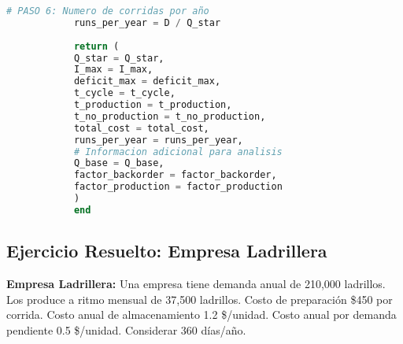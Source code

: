 \documentclass[12pt,a4paper]{book}
\begin{document}
\begin{tcolorbox}[enhanced,colback=violetaclaro,colframe=moradoacento,boxrule=3pt,arc=12pt,
		drop shadow,title={\Large\bfseries\color{white} \faIndustry\ PRODUCCI\'ON CON BACKORDERS},breakable]
\begin{lstlisting}[language=Julia,basicstyle=\footnotesize\ttfamily]
			# PASO 6: Numero de corridas por año
			runs_per_year = D / Q_star
			
			return (
			Q_star = Q_star,
			I_max = I_max,
			deficit_max = deficit_max,
			t_cycle = t_cycle,
			t_production = t_production,
			t_no_production = t_no_production,
			total_cost = total_cost,
			runs_per_year = runs_per_year,
			# Informacion adicional para analisis
			Q_base = Q_base,
			factor_backorder = factor_backorder,
			factor_production = factor_production
			)
			end
		\end{lstlisting}
		
	\end{tcolorbox}
	
	\subsection{Ejercicio Resuelto: Empresa Ladrillera}
	
	\begin{tcolorbox}[enhanced,colback=naranjaclaro,colframe=naranjaacento,boxrule=2pt,arc=8pt,
		drop shadow,title={\bfseries\color{white} \faPuzzlePiece\ PROBLEMA EMPRESA LADRILLERA}]
		
		\textbf{Empresa Ladrillera:} Una empresa tiene demanda anual de 210,000 ladrillos. Los produce a ritmo mensual de 37,500 ladrillos. Costo de preparaci\'on \$450 por corrida. Costo anual de almacenamiento 1.2 \$/unidad. Costo anual por demanda pendiente 0.5 \$/unidad. Considerar 360 d\'ias/a\~no.
		
	\end{tcolorbox}
	
\end{document}
